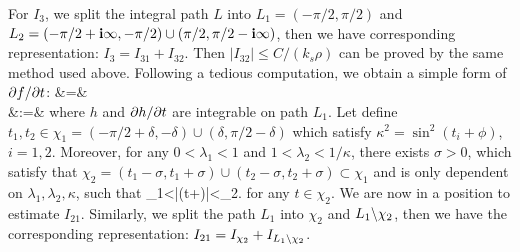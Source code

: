 \documentclass[12pt]{iopart}
\begin{document}
For $I_3$, we split the integral path $L$ into $L_1=(-\pi/2,\pi/2)$ and $L_2=(-\pi/2+\mathbf{i}\infty,-\pi/2)\cup(\pi/2,\pi/2-\mathbf{i}\infty)$, then we have corresponding representation: $I_3=I_{31}+I_{32}$.
Then $|I_{32}|\leq C/(k_s\rho)$ can be proved by the same method used above. Following a tedious computation, we obtain a simple form of $\partial f/\partial t$:
\be
{}&=& \\
&:=&
\ee
where $h$ and $\partial h/\partial t$ are integrable on path $L_1$. Let define $t_1,t_2\in \chi_1=(-\pi/2+\delta,-\delta)\cup(\delta,\pi/2-\delta)$ which satisfy $\kappa^2 = \sin^2 (t_i+\phi)$, $i=1,2$. Moreover, for any $0<\lambda_1<1$ and $1<\lambda_2<1/\kappa$, there exists $\sigma>0$, which satisfy that $\chi_2=(t_1-\sigma,t_1+\sigma)\cup(t_2-\sigma,t_2+\sigma)\subset\chi_1$ and is only dependent on $\lambda_1,\lambda_2,\kappa$, such that
\be \label{assume1}
\lambda_1\kappa<|\sin (t+\phi)|<\lambda_2\kappa.
\ee
for any $t\in\chi_2$. We are now in a position to estimate $I_{21}$. Similarly, we split the path $L_1$ into $\chi_2$ and $L_1\backslash \chi_2$, then we have the corresponding representation: $I_{21}=I_{\chi_2}+I_{L_1\backslash{\chi_2}}$.
\end{document}
